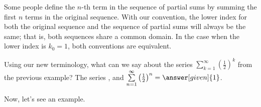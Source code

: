 \documentclass{ximera}
\begin{document}
\begin{remark}
Some people define the $n$-th term in the sequence of partial sums by summing the first $n$ terms in the original sequence.  With our convention, the lower index for both the original sequence and the sequence of partial sums will always be the same; that is, both sequences share a common domain.  In the case when the lower index is $k_0=1$, both conventions are equivalent.
\end{remark}









\begin{question}
  Using our new terminology, what can we say about the series $\sum\limits_{k=1}^\infty \left(\frac{1}{2}\right)^k$ from the previous example?  The series     , and
      $\sum\limits_{n=1}^\infty \left(\frac{1}{2}\right)^n = \answer[given]{1}$.
  \end{question}








Now, let's see an example.
\end{document}
